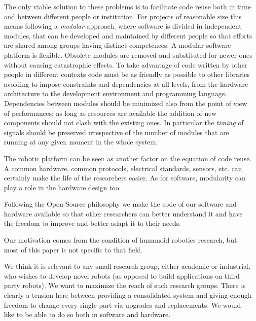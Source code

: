 The only viable solution to these problems is to facilitate 
code reuse both in time and between different people or 
institution. For projects of reasonable size this means following
a \emph{modular} approach, where software is divided in 
independent modules, that can be developed and maintained 
by different people so that efforts 
are shared among groups having distinct competences. A 
modular software platform is flexible. Obsolete modules are 
removed and substituted for newer ones without causing 
catastrophic effects. To take advantage of code written by 
other people in different contexts code must be as friendly 
as possible to other libraries avoiding to impose constraints 
and dependencies at all levels, from the hardware architecture 
to the development environment and programming language. 
Dependencies between modules should be 
minimized also from the point of view of performances; as 
long as resources are available the addition of new 
components should not clash with the existing ones. In 
particular the \emph{timing} of signals should be preserved 
irrespective of the number of modules that are running 
at any given moment in the whole system. 

%
The robotic platform can be seen as another factor on the
equation of code reuse. A common hardware, common protocols,
electrical standards, sensors, etc. can certainly make the 
life of the researchers easier. As for software, modularity 
can play a role in the hardware design too. 

Following the Open Source philosophy we make the 
code of our software and hardware available so that other 
researchers can better understand it and have the freedom 
to improve and better adapt it to their needs.

Our motivation comes from the condition of humanoid robotics 
research, but most of this paper is not specific to that field.

%
We think it is relevant to any small research group, either academic or
industrial, who wishes to develop novel robots (as opposed to 
build applications on third party robots).  We want to maximize the 
reach of such research groups. There is clearly a tension here 
between providing a consolidated system and giving enough freedom
to change every single part via upgrades and replacements. We would
like to be able to do so both in software and hardware.




